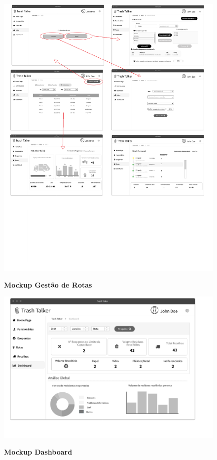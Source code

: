 \documentclass{scrreprt}
\begin{document}
	\begin{figure}[H]
		\centering
		\includegraphics[scale=.27]{imagens/MockupRotas}
		\par \textbf{Mockup Gestão de Rotas}
		\label{fig:MockupRotas}
	\end{figure}
	
	\begin{figure}[H]
		\centering
		\includegraphics[scale=.40]{imagens/MockupDashboard}
		\par \textbf{Mockup Dashboard}
		\label{fig:MockupDashboard}
	\end{figure}
	
\end{document}
